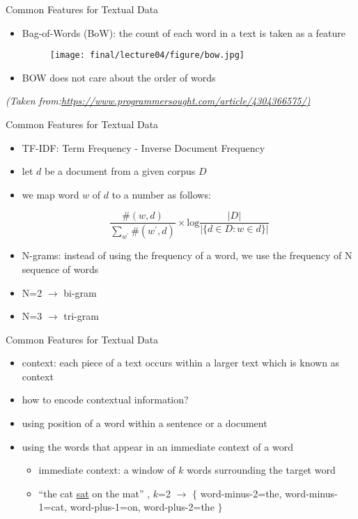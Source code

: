 \begin{frame}{Common Features for Textual Data}
    \begin{itemize}
        \item<1-> Bag-of-Words (BoW): the count of each word in a text is taken as a feature
            \begin{figure}
                \centering
                \texttt{[image: final/lecture04/figure/bow.jpg]}
            \end{figure}
    \item<2-> BOW does not care about the order of words
    \end{itemize}
    
    
    \vspace*{\fill}
     \textit{\tiny{(Taken from:\url{https://www.programmersought.com/article/4304366575/)}}}
\end{frame}
\begin{frame}{Common Features for Textual Data}
    \begin{itemize}
        \item<1-> TF-IDF: Term Frequency - Inverse Document Frequency
        \item<2-> let $d$ be a document from a given corpus $D$
        \item<3-> we map word $w$ of $d$ to a number as follows:
        
        \begin{equation*}
            \frac{\#(w,d)}{\sum_{w^\prime}  \#(w^\prime, d)} \times \text{log}\frac{|D|}{|\{ d\in D: w \in d\}|}
        \end{equation*}
        \item<4-> N-grams: instead of using the frequency of a word, we use the frequency of N sequence of words 
        \item<5-> N=2 $\rightarrow$ bi-gram 
        \item<6-> N=3 $\rightarrow$ tri-gram
    \end{itemize}
\end{frame}
\begin{frame}{Common Features for Textual Data}
\begin{itemize}
\item<1-> context: each piece of a text occurs within a larger text which is known as context
\item<2-> how to encode contextual information?
    \item<3-> using position of a word within a sentence or a document
    \item<4-> using the words that appear in an immediate context of a word
    \begin{itemize}
        \item<5-> immediate context: a window of $k$ words surrounding the target word
        \item<6-> ``the cat \underline{sat} on the mat'' , $k$=2 $\rightarrow$ $\{$ word-minus-2=the, word-minus-1=cat, word-plus-1=on, word-plus-2=the $\}$
    \end{itemize}
\end{itemize}
\end{frame}
